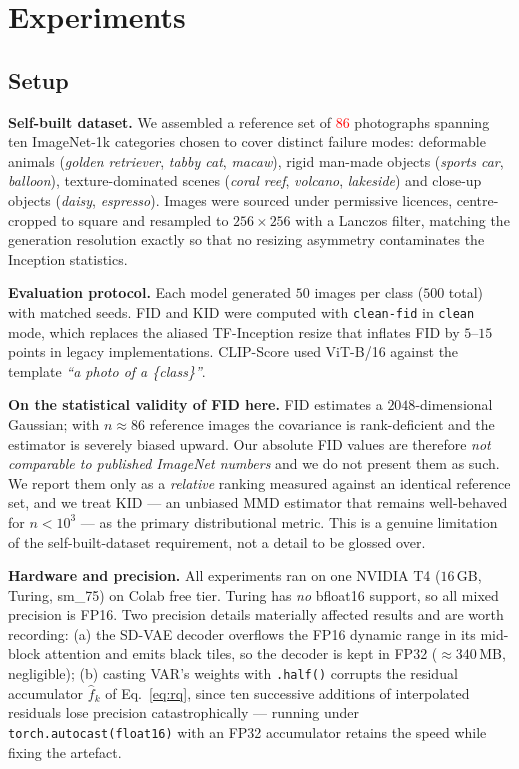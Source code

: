 \documentclass[conference]{IEEEtran}
\newcommand{\R}[1]{\textcolor{red}{#1}}
\begin{document}
\section{Experiments}

\subsection{Setup}

\textbf{Self-built dataset.} We assembled a reference set of \R{86} photographs spanning
ten ImageNet-1k categories chosen to cover distinct failure modes: deformable animals
(\emph{golden retriever}, \emph{tabby cat}, \emph{macaw}), rigid man-made objects
(\emph{sports car}, \emph{balloon}), texture-dominated scenes (\emph{coral reef},
\emph{volcano}, \emph{lakeside}) and close-up objects (\emph{daisy}, \emph{espresso}).
Images were sourced under permissive licences, centre-cropped to square and resampled to
$256{\times}256$ with a Lanczos filter, matching the generation resolution exactly so that
no resizing asymmetry contaminates the Inception statistics.

\textbf{Evaluation protocol.} Each model generated $50$ images per class ($500$ total) with
matched seeds. FID and KID were computed with \texttt{clean-fid} \cite{parmar2022cleanfid}
in \texttt{clean} mode, which replaces the aliased TF-Inception resize that inflates FID by
$5$--$15$ points in legacy implementations. CLIP-Score used
\mbox{ViT-B/16} \cite{radford2021clip} against the template \emph{``a photo of a
\{class\}''}.

\textbf{On the statistical validity of FID here.} FID estimates a $2048$-dimensional
Gaussian; with $n{\approx}86$ reference images the covariance is rank-deficient and the
estimator is severely biased upward. Our absolute FID values are therefore
\emph{not comparable to published ImageNet numbers} and we do not present them as such.
We report them only as a \emph{relative} ranking measured against an identical reference
set, and we treat KID \cite{binkowski2018kid} --- an unbiased MMD estimator that remains
well-behaved for $n<10^3$ --- as the primary distributional metric. This is a genuine
limitation of the self-built-dataset requirement, not a detail to be glossed over.

\textbf{Hardware and precision.} All experiments ran on one NVIDIA T4 ($16$\,GB, Turing,
sm\_75) on Colab free tier. Turing has \emph{no} bfloat16 support, so all mixed precision is
FP16. Two precision details materially affected results and are worth recording: (a) the
SD-VAE decoder overflows the FP16 dynamic range in its mid-block attention and emits black
tiles, so the decoder is kept in FP32 ($\approx$340\,MB, negligible); (b) casting VAR's
weights with \texttt{.half()} corrupts the residual accumulator $\hat f_k$ of
Eq.~\eqref{eq:rq}, since ten successive additions of interpolated residuals lose precision
catastrophically --- running under \texttt{torch.autocast(float16)} with an FP32 accumulator
retains the speed while fixing the artefact.
\end{document}
